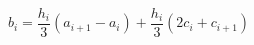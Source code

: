 \documentclass{article}
\begin{document}
    $$b_i = \frac{h_i}{3}(a_{i+1}-a_i) + \frac{h_i}{3}(2c_i+c_{i+1})$$

    
\end{document}
